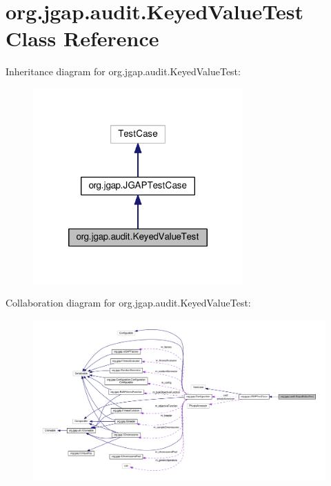 \hypertarget{classorg_1_1jgap_1_1audit_1_1_keyed_value_test}{\section{org.\-jgap.\-audit.\-Keyed\-Value\-Test Class Reference}
\label{classorg_1_1jgap_1_1audit_1_1_keyed_value_test}
}


Inheritance diagram for org.\-jgap.\-audit.\-Keyed\-Value\-Test\-:
\nopagebreak
\begin{figure}[H]
\begin{center}
\leavevmode
\includegraphics[width=228pt]{classorg_1_1jgap_1_1audit_1_1_keyed_value_test__inherit__graph}
\end{center}
\end{figure}


Collaboration diagram for org.\-jgap.\-audit.\-Keyed\-Value\-Test\-:
\nopagebreak
\begin{figure}[H]
\begin{center}
\leavevmode
\includegraphics[width=350pt]{classorg_1_1jgap_1_1audit_1_1_keyed_value_test__coll__graph}
\end{center}
\end{figure}
